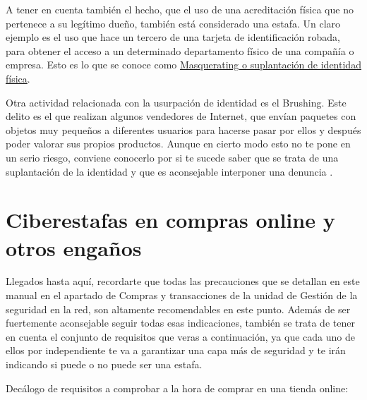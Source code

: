 \documentclass[
  spanish,
  a4paper,
  openany]{book}
\begin{document}
A tener en cuenta también el hecho, que el uso de una acreditación física que no pertenece a su legítimo dueño, también está considerado una estafa. Un claro ejemplo es el uso que hace un tercero de una tarjeta de identificación robada, para obtener el acceso a un determinado departamento físico de una compañía o empresa. Esto es lo que se conoce como \href{https://moodle2019-20.ua.es/moodle/pluginfile.php/113537/mod_resource/content/8/tema/4masquerading_mascarada.html\#:~:text=Consiste\%20en\%20suplantar\%20la\%20identidad,le\%20pertenecen\%20o\%20en\%20persona.}{Masquerating o suplantación de identidad física}.

Otra actividad relacionada con la usurpación de identidad es el Brushing. Este delito es el que realizan algunos vendedores de Internet, que envían paquetes con objetos muy pequeños a diferentes usuarios para hacerse pasar por ellos y después poder valorar sus propios productos. Aunque en cierto modo esto no te pone en un serio riesgo, conviene conocerlo por si te sucede saber que se trata de una suplantación de la identidad y que es aconsejable interponer una denuncia \citep{brushing}.

\hypertarget{ciberestafas-en-compras-online-y-otros-engauxf1os}{%
\section{Ciberestafas en compras online y otros engaños}\label{ciberestafas-en-compras-online-y-otros-engauxf1os}}

Llegados hasta aquí, recordarte que todas las precauciones que se detallan en este manual en el apartado de Compras y transacciones de la unidad de Gestión de la seguridad en la red, son altamente recomendables en este punto. Además de ser fuertemente aconsejable seguir todas esas indicaciones, también se trata de tener en cuenta el conjunto de requisitos que veras a continuación, ya que cada uno de ellos por independiente te va a garantizar una capa más de seguridad y te irán indicando si puede o no puede ser una estafa.

Decálogo de requisitos a comprobar a la hora de comprar en una tienda online:
\end{document}
